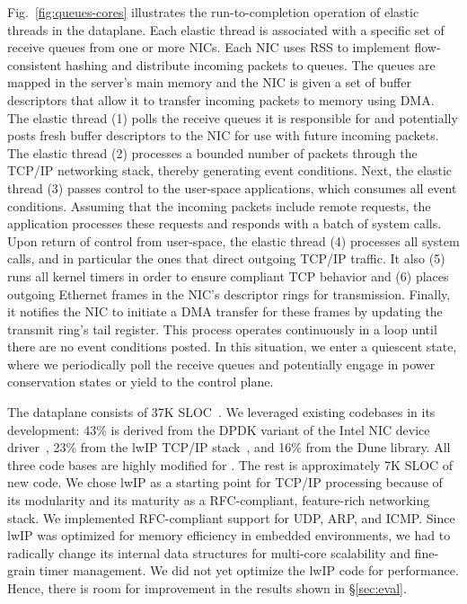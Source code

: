 Fig.~\ref{fig:queues-cores} illustrates the run-to-completion
operation of elastic threads in the \ix dataplane. Each elastic thread
is associated with a specific set of receive queues from one or more
NICs. Each NIC uses RSS to implement flow-consistent hashing and
distribute incoming packets to queues. The queues are mapped in the
server's main memory and the NIC is given a set of buffer descriptors
that allow it to transfer incoming packets to memory using DMA\@.  The
elastic thread (1) polls the receive queues it is responsible for and
potentially posts fresh buffer descriptors to the NIC for use with
future incoming packets. The elastic thread (2) processes a bounded
number of packets through the TCP/IP networking stack, thereby
generating event conditions. Next, the elastic thread (3) passes
control to the user-space applications, which consumes all event
conditions. Assuming that the incoming packets include remote
requests, the application processes these requests and responds with a
batch of system calls. Upon return of control from user-space, the
elastic thread (4) processes all system calls, and in particular the
ones that direct outgoing TCP/IP traffic. It also (5) runs all kernel
timers in order to ensure compliant TCP behavior and (6) places
outgoing Ethernet frames in the NIC's descriptor rings for
transmission. Finally, it notifies the NIC to initiate a DMA transfer
for these frames by updating the transmit ring's tail register.
This process operates continuously in a loop until there are no
event conditions posted. In this situation, we enter a quiescent state, where
we periodically poll the receive queues and potentially engage
in power conservation states or yield to the control plane.

The \ix dataplane consists of 37K SLOC~\cite{url:sloccount}.  We leveraged existing
codebases in its development: 43\% is derived from the DPDK variant of
the Intel NIC device driver~\cite{intel:dpdk}, 23\% from the lwIP
TCP/IP stack~\cite{dunkels2001design}, and 16\% from the Dune library.
All three code bases are highly modified for \ix. The rest is
approximately 7K SLOC of new code. We chose lwIP as a starting point
for TCP/IP processing because of its modularity and its maturity as a
RFC-compliant, feature-rich networking stack. We implemented
RFC-compliant support for UDP, ARP, and ICMP.
Since lwIP was optimized for memory efficiency in embedded
environments, we had to radically change its internal data structures
for multi-core scalability and fine-grain timer management. We did not
yet optimize the lwIP code for performance. Hence, there is room for
improvement in the results shown in \S\ref{sec:eval}.



